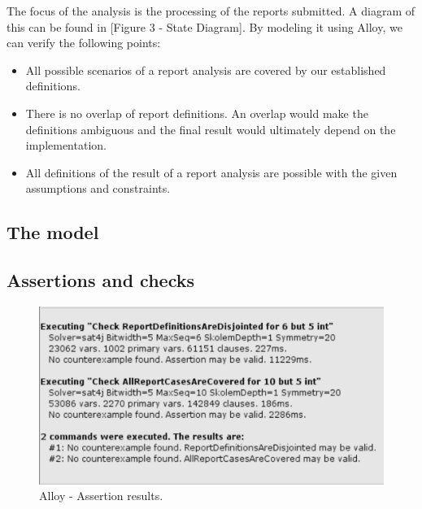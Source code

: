 The focus of the analysis is the processing of the reports submitted. A diagram of this can be found in [Figure 3 - State Diagram]. By modeling it using Alloy, we can verify the following points:

\begin{itemize}
    \item All possible scenarios of a report analysis are covered by our established definitions.
    \item There is no overlap of report definitions. An overlap would make the definitions ambiguous and the final result would ultimately depend on the implementation.
    \item All definitions of the result of a report analysis are possible with the given assumptions and constraints.
\end{itemize}

\noindent{}


\subsection{The model}




\subsection{Assertions and checks}


\begin{figure}[H]
    \centering
    \includegraphics[width=\textwidth]{Images/alloy/assertion-results.png}
    \caption{\label{fig:alloy}Alloy - Assertion results.}
\end{figure}

